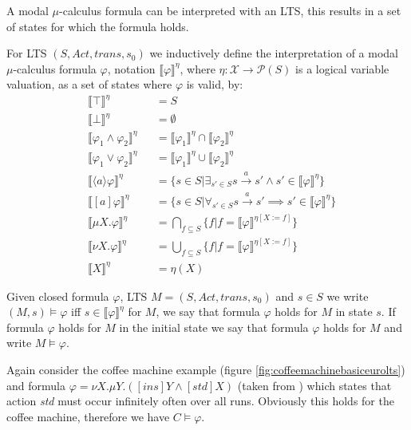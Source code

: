 A modal $\mu$-calculus formula can be interpreted with an LTS, this results in a set of states for which the formula holds.
\begin{definition}
	\label{def_mu_sem} For LTS $(S, Act, trans, s_0)$ we inductively define the interpretation of a modal $\mu$-calculus formula $\varphi$, notation
	$\llbracket \varphi \rrbracket^\eta$, where $\eta : \mathcal{X} \rightarrow \mathcal{P}(S)$ is a logical variable valuation, as a set of states
	where $\varphi$ is valid, by:
	\begin{align*}
	&\llbracket {\top} \rrbracket^\eta &&= S\\
	&\llbracket {\bot} \rrbracket^\eta &&= \emptyset\\
	&\llbracket \varphi_1 \wedge \varphi_2 \rrbracket^\eta &&= \llbracket \varphi_1 \rrbracket^\eta \cap \llbracket \varphi_2 \rrbracket^\eta \\
	&\llbracket \varphi_1 \vee \varphi_2 \rrbracket^\eta &&= \llbracket \varphi_1 \rrbracket^\eta \cup \llbracket \varphi_2 \rrbracket^\eta\\
	&\llbracket \langle a \rangle \varphi \rrbracket^\eta &&= \{s \in S|\exists_{s' \in S} s \xrightarrow {a} s' \wedge s' \in \llbracket \varphi \rrbracket^\eta\}\\
	&\llbracket [ a ] \varphi \rrbracket^\eta &&= \{s \in S|\forall_{s' \in S} s \xrightarrow {a} s' \implies s' \in \llbracket \varphi \rrbracket^\eta\}\\
	&\llbracket \mu X. \varphi \rrbracket^\eta &&= \bigcap_{f \subseteq S}\{f | f = \llbracket \varphi \rrbracket^{\eta[X:=f]}\}\\
	&\llbracket \nu X. \varphi \rrbracket^\eta &&= \bigcup_{f \subseteq S}\{f | f = \llbracket \varphi \rrbracket^{\eta[X:=f]}\}\\
	&\llbracket X \rrbracket^\eta &&= \eta(X)
	\end{align*}
\end{definition}

Given closed formula $\varphi$, LTS $M = (S, Act, trans, s_0)$ and $s \in S$ we write $(M,s) \models \varphi$ iff $s \in \llbracket \varphi \rrbracket^\eta$ for $M$, we say that formula $\varphi$ holds for $M$ in state $s$. If formula $\varphi$ holds for $M$ in the initial state we say that formula $\varphi$ holds for $M$ and write $M \models \varphi$.

Again consider the coffee machine example (figure \ref{fig:coffeemachinebasiceurolts}) and formula $\varphi = \nu X. \mu Y. ([ins]Y \wedge [std] X)$ (taken from \cite{FamBasedModelCheckingWithMCRL2}) which states that action \textit{std} must occur infinitely often over all runs. Obviously this holds for the coffee machine, therefore we have $C \models \varphi$.

